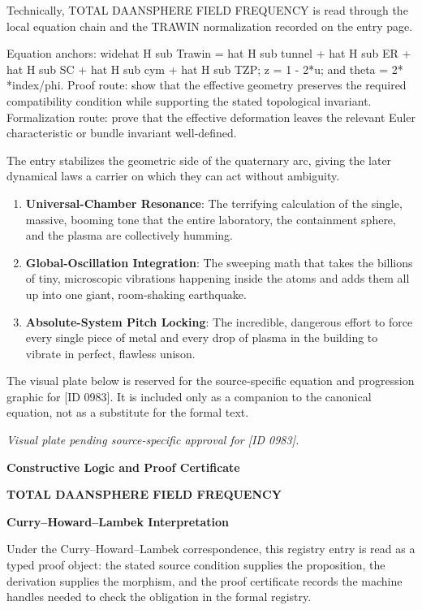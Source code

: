 Technically, TOTAL DAANSPHERE FIELD FREQUENCY is read through the local equation chain and the TRAWIN normalization recorded on the entry page.

Equation anchors: widehat H sub Trawin = hat H sub tunnel + hat H sub ER + hat H sub SC + hat H sub cym + hat H sub TZP; z = 1 - 2*u; and theta = 2* *index/phi. Proof route: show that the effective geometry preserves the required compatibility condition while supporting the stated topological invariant. Formalization route: prove that the effective deformation leaves the relevant Euler characteristic or bundle invariant well-defined.

The entry stabilizes the geometric side of the quaternary arc, giving the later dynamical laws a carrier on which they can act without ambiguity.
\endgroup

\begin{enumerate}[leftmargin=1.6em,itemsep=6pt,topsep=4pt]
\item \textbf{Universal-Chamber Resonance}: The terrifying calculation of the single, massive, booming tone that the entire laboratory, the containment sphere, and the plasma are collectively humming.
\item \textbf{Global-Oscillation Integration}: The sweeping math that takes the billions of tiny, microscopic vibrations happening inside the atoms and adds them all up into one giant, room-shaking earthquake.
\item \textbf{Absolute-System Pitch Locking}: The incredible, dangerous effort to force every single piece of metal and every drop of plasma in the building to vibrate in perfect, flawless unison.
\end{enumerate}

\begingroup\footnotesize\sloppy
The visual plate below is reserved for the source-specific equation and progression graphic for [ID 0983]. It is included only as a companion to the canonical equation, not as a substitute for the formal text.
\par\endgroup
\begingroup\footnotesize\itshape
Visual plate pending source-specific approval for [ID 0983].
\par\endgroup

\clearpage
\begingroup\tzpsupportsetup
\noindent\textbf{\fontsize{10.8pt}{12.8pt}\selectfont [ID 0983] Constructive Logic and Proof Certificate}\par
\noindent\textbf{\fontsize{10pt}{12pt}\selectfont TOTAL DAANSPHERE FIELD FREQUENCY}\par
\vspace{0.45em}
\begingroup
\footnotesize
\setlength{\parskip}{0.22em}
\setlength{\parindent}{0pt}
\noindent\textbf{Curry--Howard--Lambek Interpretation}\par
Under the Curry--Howard--Lambek correspondence, this registry entry is read as a typed proof
object: the stated source condition supplies the proposition, the derivation supplies the
morphism, and the proof certificate records the machine handles needed to check the obligation
in the formal registry.


